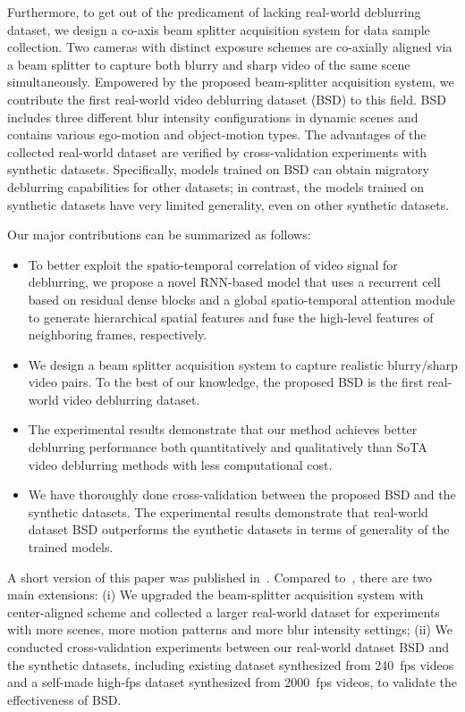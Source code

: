 \documentclass[twocolumn]{svjour3}          \smartqed  \usepackage{graphicx}
\begin{document}
Furthermore, to get out of the predicament of lacking real-world deblurring dataset, we design a co-axis beam splitter acquisition system for data sample collection. Two cameras with distinct exposure schemes are co-axially aligned via a beam splitter to capture both blurry and sharp video of the same scene simultaneously. Empowered by the proposed beam-splitter acquisition system, we contribute the first real-world video deblurring dataset (BSD) to this field. BSD includes three different blur intensity configurations in dynamic scenes and contains various ego-motion and object-motion types. The advantages of the collected real-world dataset are verified by cross-validation experiments with synthetic datasets. Specifically, models trained on BSD can obtain migratory deblurring capabilities for other datasets; in contrast, the models trained on synthetic datasets have very limited generality, even on other synthetic datasets.  

Our major contributions can be summarized as follows:
\begin{itemize}
	\item To better exploit the spatio-temporal correlation of video signal for deblurring, we propose a novel RNN-based model that uses a recurrent cell based on residual dense blocks and a global spatio-temporal attention module to generate hierarchical spatial features and fuse the high-level features of neighboring frames, respectively.
	
	\item We design a beam splitter acquisition system to capture realistic blurry/sharp video pairs. To the best of our knowledge, the proposed BSD is the first real-world video deblurring dataset. 
	
	\item The experimental results demonstrate that our method achieves better deblurring performance both quantitatively and qualitatively than SoTA video deblurring methods with less computational cost.
	
	\item We have thoroughly done cross-validation between the proposed BSD and the synthetic datasets. The experimental results demonstrate that real-world dataset BSD outperforms the synthetic datasets in terms of generality of the trained models.
\end{itemize}

A short version of this paper was published in~\cite{zhong2020efficient}. Compared to~\cite{zhong2020efficient}, there are two main extensions: (i) We upgraded the beam-splitter acquisition system with center-aligned scheme and collected a larger real-world dataset for experiments with more scenes, more motion patterns and more blur intensity settings; (ii) We conducted cross-validation experiments between our real-world dataset BSD and the synthetic datasets, including existing dataset synthesized from \SI{240}{fps} videos and a self-made high-fps dataset synthesized from \SI{2000}{fps} videos, to validate the effectiveness of BSD.
\end{document}
